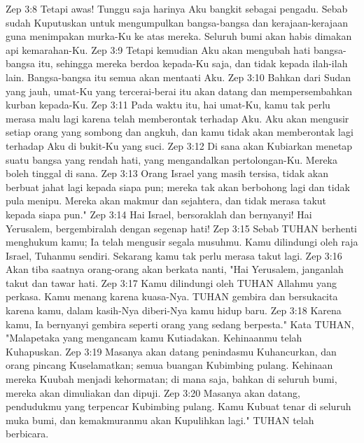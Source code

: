 Zep 3:8  Tetapi awas! Tunggu saja harinya Aku bangkit sebagai pengadu. Sebab sudah Kuputuskan untuk mengumpulkan bangsa-bangsa dan kerajaan-kerajaan guna menimpakan murka-Ku ke atas mereka. Seluruh bumi akan habis dimakan api kemarahan-Ku.
Zep 3:9  Tetapi kemudian Aku akan mengubah hati bangsa-bangsa itu, sehingga mereka berdoa kepada-Ku saja, dan tidak kepada ilah-ilah lain. Bangsa-bangsa itu semua akan mentaati Aku.
Zep 3:10  Bahkan dari Sudan yang jauh, umat-Ku yang tercerai-berai itu akan datang dan mempersembahkan kurban kepada-Ku.
Zep 3:11  Pada waktu itu, hai umat-Ku, kamu tak perlu merasa malu lagi karena telah memberontak terhadap Aku. Aku akan mengusir setiap orang yang sombong dan angkuh, dan kamu tidak akan memberontak lagi terhadap Aku di bukit-Ku yang suci.
Zep 3:12  Di sana akan Kubiarkan menetap suatu bangsa yang rendah hati, yang mengandalkan pertolongan-Ku. Mereka boleh tinggal di sana.
Zep 3:13  Orang Israel yang masih tersisa, tidak akan berbuat jahat lagi kepada siapa pun; mereka tak akan berbohong lagi dan tidak pula menipu. Mereka akan makmur dan sejahtera, dan tidak merasa takut kepada siapa pun."
Zep 3:14  Hai Israel, bersoraklah dan bernyanyi! Hai Yerusalem, bergembiralah dengan segenap hati!
Zep 3:15  Sebab TUHAN berhenti menghukum kamu; Ia telah mengusir segala musuhmu. Kamu dilindungi oleh raja Israel, Tuhanmu sendiri. Sekarang kamu tak perlu merasa takut lagi.
Zep 3:16  Akan tiba saatnya orang-orang akan berkata nanti, "Hai Yerusalem, janganlah takut dan tawar hati.
Zep 3:17  Kamu dilindungi oleh TUHAN Allahmu yang perkasa. Kamu menang karena kuasa-Nya. TUHAN gembira dan bersukacita karena kamu, dalam kasih-Nya diberi-Nya kamu hidup baru.
Zep 3:18  Karena kamu, Ia bernyanyi gembira seperti orang yang sedang berpesta." Kata TUHAN, "Malapetaka yang mengancam kamu Kutiadakan. Kehinaanmu telah Kuhapuskan.
Zep 3:19  Masanya akan datang penindasmu Kuhancurkan, dan orang pincang Kuselamatkan; semua buangan Kubimbing pulang. Kehinaan mereka Kuubah menjadi kehormatan; di mana saja, bahkan di seluruh bumi, mereka akan dimuliakan dan dipuji.
Zep 3:20  Masanya akan datang, pendudukmu yang terpencar Kubimbing pulang. Kamu Kubuat tenar di seluruh muka bumi, dan kemakmuranmu akan Kupulihkan lagi." TUHAN telah berbicara.



